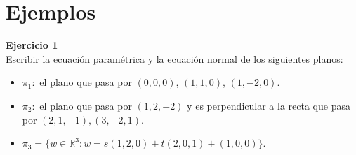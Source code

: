 \documentclass{article}
\newenvironment{problem}[2][Ejercicio]
    { \begin{mdframed}[backgroundcolor=gray!20] \textbf{#1 #2} \\}
    {  \end{mdframed}}
\begin{document}
\section*{Ejemplos}
\begin{problem}{1}
    Escribir la ecuación paramétrica y la ecuación normal de los siguientes planos:
\begin{itemize}
\item 
$\pi_1 :$ el plano que pasa por $(0,0,0)$, $(1,1,0)$, $(1,-2,0)$.
\item 
$\pi_2 :$ el plano que pasa por $(1, 2, -2)$ y es perpendicular a la recta que pasa por $(2, 1, -1), (3, -2, 1)$.
\item 
$\pi_3 = \{w \in \mathbb{R}^3 : w = s(1, 2, 0) + t(2, 0, 1) + (1, 0, 0) \}.$
\end{itemize}
\end{problem}
\end{document}
